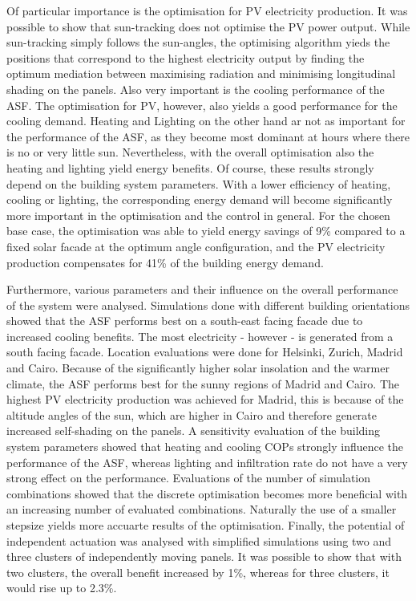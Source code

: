 Of particular importance is the optimisation for PV electricity production. It was possible to show that sun-tracking does not optimise the PV power output. While sun-tracking simply follows the sun-angles, the optimising algorithm yieds the positions that correspond to the highest electricity output by finding the optimum mediation between maximising radiation and minimising longitudinal shading on the panels. Also very important is the cooling performance of the ASF. The optimisation for PV, however, also yields a good performance for the cooling demand. Heating and Lighting on the other hand ar not as important for the performance of the ASF, as they become most dominant at hours where there is no or very little sun. Nevertheless, with the overall optimisation also the heating and lighting yield energy benefits. Of course, these results strongly depend on the building system parameters. With a lower efficiency of heating, cooling or lighting, the corresponding energy demand will become significantly more important in the optimisation and the control in general. For the chosen base case, the optimisation was able to yield energy savings of 9\% compared to a fixed solar facade at the optimum angle configuration, and the PV electricity production compensates for 41\% of the building energy demand. 

Furthermore, various parameters and their influence on the overall performance of the system were analysed. Simulations done with different building orientations showed that the ASF performs best on a south-east facing facade due to increased cooling benefits. The most electricity - however - is generated from a south facing facade. Location evaluations were done for Helsinki, Zurich, Madrid and Cairo. Because of the significantly higher solar insolation and the warmer climate, the ASF performs best for the sunny regions of Madrid and Cairo. The highest PV electricity production was achieved for Madrid, this is because of the altitude angles of the sun, which are higher in Cairo and therefore generate increased self-shading on the panels. A sensitivity evaluation of the building system parameters showed that heating and cooling COPs strongly influence the performance of the ASF, whereas lighting and infiltration rate do not have a very strong effect on the performance. Evaluations of the number of simulation combinations showed that the discrete optimisation becomes more beneficial with an increasing number of evaluated combinations. Naturally the use of a smaller stepsize yields more accuarte results of the optimisation. Finally, the potential of independent actuation was analysed with simplified simulations using two and three clusters of independently moving panels. It was possible to show that with two clusters, the overall benefit increased by 1\%, whereas for three clusters, it would rise up to 2.3\%. 

